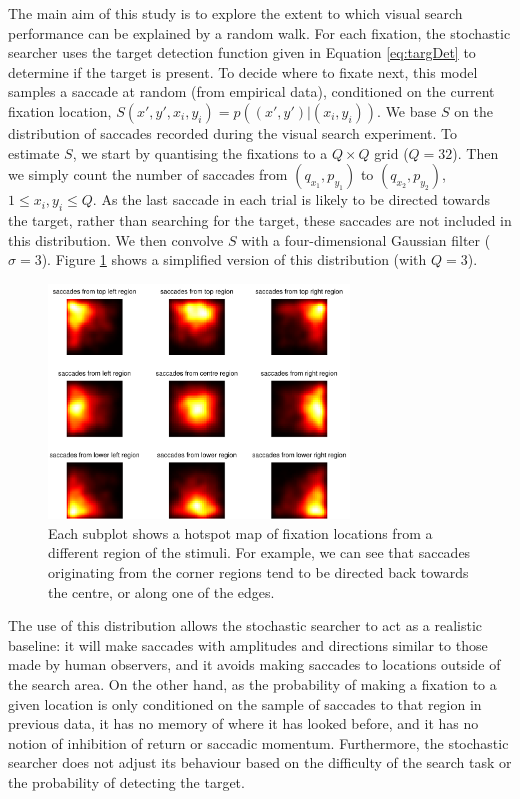 \documentclass[man]{apa6}
\begin{document}
The main aim of this study is to explore the extent to which visual search performance can be explained by a random walk. For each fixation, the stochastic searcher uses the target detection function given in Equation \ref{eq:targDet} to determine if the target is present. To decide where to fixate next, this model samples a saccade at random (from empirical data), conditioned on the current fixation location, $S(x',y',x_i, y_i)=p\left((x',y')|(x_i,y_i)\right)$. We base $S$ on the distribution of saccades recorded during the visual search experiment. To estimate $S$, we start by quantising the fixations to a $Q\times Q$ grid ($Q=32$). Then we simply count the number of saccades from $(q_{x_1}, p_{y_1})$ to $(q_{x_2}, p_{y_2})$, $1\leq x_i, y_i \leq Q$. As the last saccade in each trial is likely to be directed towards the target, rather than searching for the target, these saccades are not included in this distribution. We then convolve $S$ with a four-dimensional Gaussian filter ($\sigma=3$). Figure \ref{fig:saccDistExample} shows a simplified version of this distribution (with $Q=3$). 

\begin{figure}
	\centering
	\includegraphics[width=8cm]{fig/saccDistExample.pdf}
	\caption{Each subplot shows a hotspot map of fixation locations from a different region of the stimuli. For example, we can see that saccades originating from the corner regions tend to be directed back towards the centre, or along one of the edges.}
	\label{fig:saccDistExample}
\end{figure}

The use of this distribution allows the stochastic searcher to act as a realistic baseline: it will make saccades with amplitudes and directions similar to those made by human observers, and it avoids making saccades to locations outside of the search area. On the other hand, as the probability of making a fixation to a given location is only conditioned on the sample of saccades to that region in previous data, it has no memory of where it has looked before, and it has no notion of inhibition of return or saccadic momentum. Furthermore, the stochastic searcher does not adjust its behaviour based on the difficulty of the search task or the probability of detecting the target. 
\end{document}
